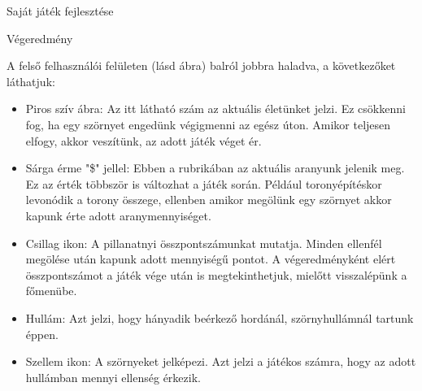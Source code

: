 \begin{MyChapter}{Saját játék fejlesztése}
\begin{MySection}{Végeredmény}
		
		A felső felhasználói felületen (lásd  ábra) balról jobbra haladva, a következőket láthatjuk:
		
		\begin{itemize}
			\item Piros szív ábra: Az itt látható szám az aktuális életünket jelzi. Ez csökkenni fog, ha egy szörnyet engedünk végigmenni az egész úton. Amikor teljesen elfogy, akkor veszítünk, az adott játék véget ér.
			
			\item Sárga érme "\$" jellel: Ebben a rubrikában az aktuális aranyunk jelenik meg. Ez az érték többször is változhat a játék során. Például toronyépítéskor levonódik a torony összege, ellenben amikor megölünk egy szörnyet akkor kapunk érte adott aranymennyiséget.
			
			\item Csillag ikon: A pillanatnyi összpontszámunkat mutatja. Minden ellenfél megölése után kapunk adott mennyiségű pontot. A végeredményként elért összpontszámot a játék vége után is megtekinthetjuk, mielőtt visszalépünk a főmenübe.
			
			\item Hullám: Azt jelzi, hogy hányadik beérkező hordánál, szörnyhullámnál tartunk éppen.
			
			\item Szellem ikon: A szörnyeket jelképezi. Azt jelzi a játékos számra, hogy az adott hullámban mennyi ellenség érkezik.
		\end{itemize}
		

\end{MySection}
\end{MyChapter}
